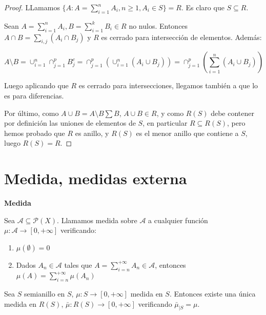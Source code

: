 \begin{proof}
 LLamamos $\{A: A=\sum_{i=1}^n A_i, n\ge 1, A_i \in S\} = R$. Es claro que $S\subseteq R$.
 
 Sean $A = \sum_{i=1}^n A_i, B = \sum_{i=1}^k B_i \in R$ no nulos. Entonces $A\cap B = \sum_{i,j} (A_i \cap B_j)$ y $R$
 es cerrado para intersección de elementos. Además:
 
 \[A\setminus B = \cup_{i=1}^n \cap_{j=1}^p B_j^c = \cap_{j=1}^p \left(\cup_{i=1}^n (A_i \cup B_j)\right) = \cap_{j=1}^p \left(\sum_{i=1}^n (A_i \cup B_j)\right)\]
 
 Luego aplicando que $R$ es cerrado para intersecciones, llegamos también a que lo es para diferencias.
 
 Por último, como $A\cup B = A \setminus B \sum B$, $A \cup B \in R$, y como $R(S)$ debe contener por definición
 las uniones de elementos de $S$, en particular $R\subseteq R(S)$, pero hemos probado que $R$ es anillo, y $R(S)$
 es el menor anillo que contiene a $S$, luego $R(S) = R$.
\end{proof}


\section{Medida, medidas externa}

\begin{definition} \textbf{Medida}

 Sea $\mathcal{A} \subseteq \mathcal{P}(X)$. Llamamos medida sobre $\mathcal{A}$ a cualquier función 
 $\mu: \mathcal{A} \rightarrow [0, +\infty]$ verificando:

 \begin{enumerate}[i]
  \item $\mu(\emptyset) = 0$
  \item Dados $A_n \in \mathcal{A}$ tales que $A = \sum_{i=n}^{+\infty} A_n \in \mathcal{A}$, entonces 
  $\mu(A)= \sum_{i=n}^{+\infty} \mu(A_n)$
 \end{enumerate}
\end{definition}


\begin{theorem}
 Sea $S$ semianillo en $S$, $\mu: S \rightarrow [0,+\infty]$ medida en $S$. Entonces existe una única medida 
 en $R(S)$, $\bar{\mu}: R(S) \rightarrow [0,+\infty]$ verificando $\bar{\mu}_{|S} = \mu$.
\end{theorem}

